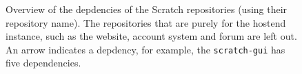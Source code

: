 \documentclass[../main]{subfiles}
\begin{document}
\begin{figure}
    
    \caption{Overview of the depdencies of the Scratch repositories (using their repository name). The repositories that are purely for the hostend instance, such as the website, account system and forum are left out. An arrow indicates a depdency, for example, the \texttt{scratch-gui} has five dependencies.}
    \label{fig:scratch-dependencies}
\end{figure}

\end{document}
